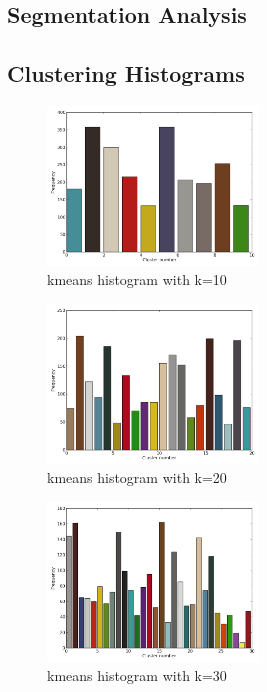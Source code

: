 \documentclass[10pt,twocolumn,letterpaper]{article}
\begin{document}
\subsection{Segmentation Analysis}

\subsection{Clustering Histograms}

\begin{figure}[p]
  \centering
  \includegraphics[width=0.50\textwidth]{../results/10_histogram.png}
  \caption{kmeans histogram with k=10}
  \label{k-10}
\end{figure}

\begin{figure}[p]
  \centering
  \includegraphics[width=0.50\textwidth]{../results/20_histogram.png}
  \caption{kmeans histogram with k=20}
  \label{k-20}
\end{figure}

\begin{figure}[p]
  \centering
  \includegraphics[width=0.50\textwidth]{../results/30_histogram.png}
  \caption{kmeans histogram with k=30}
  \label{k-30}
\end{figure}
\end{document}
